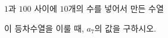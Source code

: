$1$과 $100$ 사이에 $10$개의 수를 넣어서 만든 수열 \par\smallskip{}\par\smallskip\noindent 이 등차수열을 이룰 때, $a_7$의 값을 구하시오.
